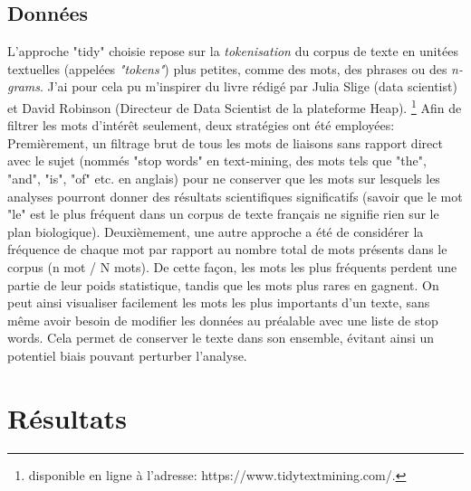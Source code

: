 \documentclass{book}
\begin{document}
\section{Données}
\noindent
L'approche "tidy" choisie repose sur la \textit{tokenisation} du corpus
de texte en unitées textuelles (appelées \textit{"tokens"}) plus petites, comme
des mots, des phrases ou des \textit{n-grams}. J'ai pour cela pu m'inspirer du
livre rédigé par Julia Slige (data scientist) et David Robinson (Directeur de
Data Scientist de la plateforme Heap). \footnote{disponible en ligne à l'adresse:
https://www.tidytextmining.com/.} Afin de filtrer les mots d'intérêt seulement, deux stratégies ont été
employées: Premièrement, un filtrage brut de tous les mots de liaisons sans
rapport direct avec le sujet (nommés "stop words" en text-mining, des mots tels
que "the", "and", "is", "of" etc. en anglais) pour ne conserver que les mots
sur lesquels les analyses pourront donner des résultats scientifiques
significatifs (savoir que le mot "le" est le plus fréquent dans un corpus de
texte français ne signifie rien sur le plan biologique). Deuxièmement, une
autre approche a été de considérer la fréquence de chaque mot par rapport au
nombre total de mots présents dans le corpus (n mot / N mots). De cette façon,
les mots les plus fréquents perdent une partie de leur poids statistique, tandis que les mots plus rares en gagnent. On peut ainsi visualiser facilement les mots les plus importants d'un texte, sans même
avoir besoin de modifier les données au préalable avec une liste de stop words.
Cela permet de conserver le texte dans son ensemble, évitant ainsi un potentiel
biais pouvant perturber l'analyse.

\chapter{\label{Troisieme Chapitre}Résultats}
\end{document}

